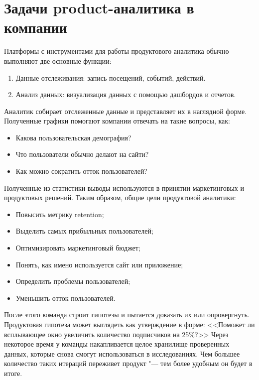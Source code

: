\documentclass[referat, times]{SCWorks}
\begin{document}
\section {Задачи product-аналитика в компании}
Платформы с инструментами для работы продуктового аналитика обычно выполняют две основные функции:
\begin{enumerate}
    \item Данные отслеживания: запись посещений, событий, действий.
    \item Анализ данных: визуализация данных с помощью дашбордов и отчетов.
\end{enumerate}

Аналитик собирает отслеженные данные и представляет их в наглядной форме. Полученные графики помогают компании отвечать на такие вопросы, как:

\begin{itemize}
    \item Какова пользовательская демография?
    \item Что пользователи обычно делают на сайти?
    \item Как можно сократить отток пользователей?
\end{itemize}

Полученные из статистики выводы используются в принятии маркетинговых и продуктовых решений. Таким образом, общие цели продуктовой аналитики:
\begin{itemize}
    \item Повысить метрику retention;
    \item Выделить самых прибыльных пользователей;
    \item Оптимизировать маркетинговый бюджет;
    \item Понять, как имено используется сайт или приложение;
    \item Определить проблемы пользователей;
    \item Уменьшить отток пользователей.
\end{itemize}

После этого команда строит гипотезы и пытается доказать их или опровергнуть. Продуктовая гипотеза может выглядеть как утверждение в форме: <<Поможет ли всплывающее окно увеличить количество подписчиков на 25\%?>>
Через некоторое время у команды накапливается целое хранилище проверенных данных, которые снова смогут использоваться в исследованиях. Чем большее количество таких итераций переживет продукт "--- тем более удобным он будет в итоге\cite{tasksInCompany}.
\end{document}
